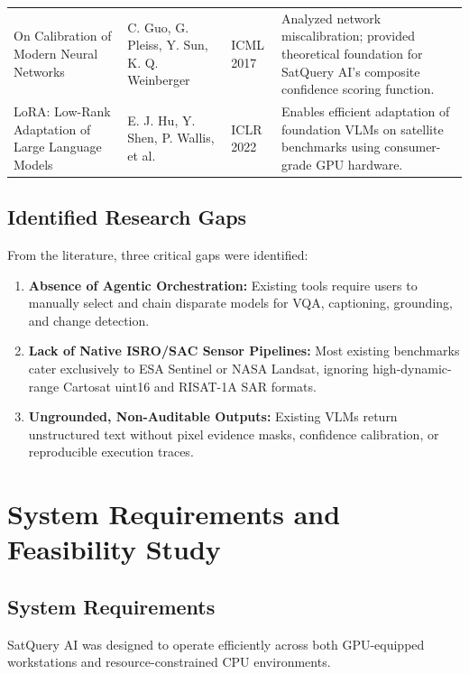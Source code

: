 \documentclass[12pt,a4paper]{report}
\begin{document}
\begin{singlespacing}
\begin{longtable}{@{}p{}p{}p{}p{}@{}}
On Calibration of Modern Neural Networks &
C. Guo, G. Pleiss, Y. Sun, K. Q. Weinberger & ICML 2017 &
Analyzed network miscalibration; provided theoretical foundation for SatQuery AI's composite confidence scoring function.\\[0.4em]

LoRA: Low-Rank Adaptation of Large Language Models &
E. J. Hu, Y. Shen, P. Wallis, et al. & ICLR 2022 &
Enables efficient adaptation of foundation VLMs on satellite benchmarks using consumer-grade GPU hardware.\\
\end{longtable}
\end{singlespacing}

\section{Identified Research Gaps}
From the literature, three critical gaps were identified:
\begin{enumerate}
    \item \textbf{Absence of Agentic Orchestration:} Existing tools require users to manually select and chain disparate models for VQA, captioning, grounding, and change detection.
    \item \textbf{Lack of Native ISRO/SAC Sensor Pipelines:} Most existing benchmarks cater exclusively to ESA Sentinel or NASA Landsat, ignoring high-dynamic-range Cartosat uint16 and RISAT-1A SAR formats.
    \item \textbf{Ungrounded, Non-Auditable Outputs:} Existing VLMs return unstructured text without pixel evidence masks, confidence calibration, or reproducible execution traces.

\end{enumerate}

\chapter{System Requirements and Feasibility Study}

\section{System Requirements}
SatQuery AI was designed to operate efficiently across both GPU-equipped workstations and resource-constrained CPU environments.
\end{document}

